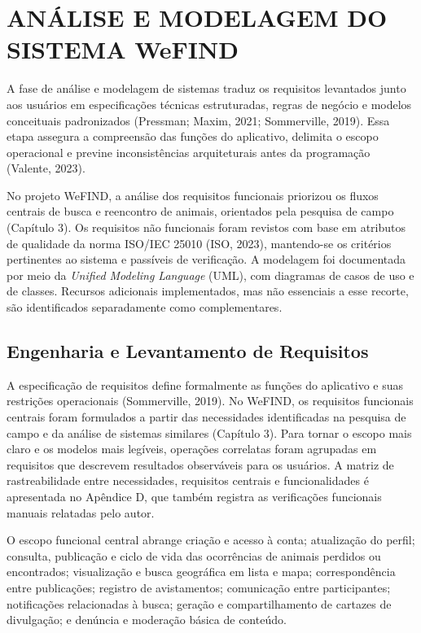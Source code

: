 \section{ANÁLISE E MODELAGEM DO SISTEMA WeFIND}

A fase de análise e modelagem de sistemas traduz os requisitos levantados junto aos usuários em especificações técnicas estruturadas, regras de negócio e modelos conceituais padronizados (Pressman; Maxim, 2021; Sommerville, 2019). Essa etapa assegura a compreensão das funções do aplicativo, delimita o escopo operacional e previne inconsistências arquiteturais antes da programação (Valente, 2023).

No projeto WeFIND, a análise dos requisitos funcionais priorizou os fluxos centrais de busca e reencontro de animais, orientados pela pesquisa de campo (Capítulo 3). Os requisitos não funcionais foram revistos com base em atributos de qualidade da norma ISO/IEC 25010 (ISO, 2023), mantendo-se os critérios pertinentes ao sistema e passíveis de verificação. A modelagem foi documentada por meio da \textit{Unified Modeling Language} (UML), com diagramas de casos de uso e de classes. Recursos adicionais implementados, mas não essenciais a esse recorte, são identificados separadamente como complementares.


\subsection{Engenharia e Levantamento de Requisitos}

A especificação de requisitos define formalmente as funções do aplicativo e suas restrições operacionais (Sommerville, 2019). No WeFIND, os requisitos funcionais centrais foram formulados a partir das necessidades identificadas na pesquisa de campo e da análise de sistemas similares (Capítulo 3). Para tornar o escopo mais claro e os modelos mais legíveis, operações correlatas foram agrupadas em requisitos que descrevem resultados observáveis para os usuários. A matriz de rastreabilidade entre necessidades, requisitos centrais e funcionalidades é apresentada no Apêndice D, que também registra as verificações funcionais manuais relatadas pelo autor.

O escopo funcional central abrange criação e acesso à conta; atualização do perfil; consulta, publicação e ciclo de vida das ocorrências de animais perdidos ou encontrados; visualização e busca geográfica em lista e mapa; correspondência entre publicações; registro de avistamentos; comunicação entre participantes; notificações relacionadas à busca; geração e compartilhamento de cartazes de divulgação; e denúncia e moderação básica de conteúdo.


